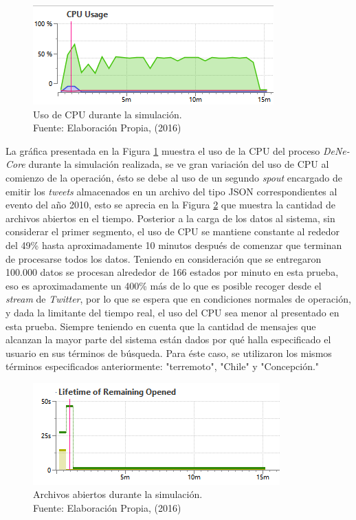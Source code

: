 \begin{figure}[H]
        \centering
        \captionsetup{justification=centering}
        \includegraphics[scale=1.2]{images/CPUUsageN.png}
        \caption[Uso de CPU durante la simulación.]{Uso de CPU durante la simulación.\\Fuente: Elaboración Propia, (2016)}
        \label{fig:cpuUsage}
\end{figure}

La gráfica presentada en la Figura \ref{fig:cpuUsage} muestra el uso de la CPU del proceso \textit{DeNe-Core} durante la simulación realizada, se ve gran variación del uso de CPU al comienzo de la operación, ésto se debe al uso de un segundo \textit{spout} encargado de emitir los \textit{tweets} almacenados en un archivo del tipo JSON correspondientes al evento del año 2010, esto se aprecia en la Figura \ref{fig:fileOpenClose} que muestra la cantidad de archivos abiertos en el tiempo. Posterior a la carga de los datos al sistema, sin considerar el primer segmento, el uso de CPU se mantiene constante al rededor del 49\% hasta aproximadamente 10 minutos después de comenzar que terminan de procesarse todos los datos. Teniendo en consideración que se entregaron 100.000 datos se procesan alrededor de 166 estados por minuto en esta prueba, eso es aproximadamente un 400\% más de lo que es posible recoger desde el \textit{stream} de \textit{Twitter}, por lo que se espera que en condiciones normales de operación, y dada la limitante del tiempo real, el uso del CPU sea menor al presentado en esta prueba. Siempre teniendo en cuenta que la cantidad de mensajes que alcanzan la mayor parte del sistema están dados por qué halla especificado el usuario en sus términos de búsqueda. Para éste caso, se utilizaron los mismos términos especificados anteriormente: "terremoto", "Chile" y "Concepción."

\begin{figure}[H]
        \centering
        \captionsetup{justification=centering}
        \includegraphics[scale=1.2]{images/FileOpenedClosed.png}
        \caption[Archivos abiertos durante la simulación.]{Archivos abiertos durante la simulación.\\Fuente: Elaboración Propia, (2016)}
        \label{fig:fileOpenClose}
\end{figure}




